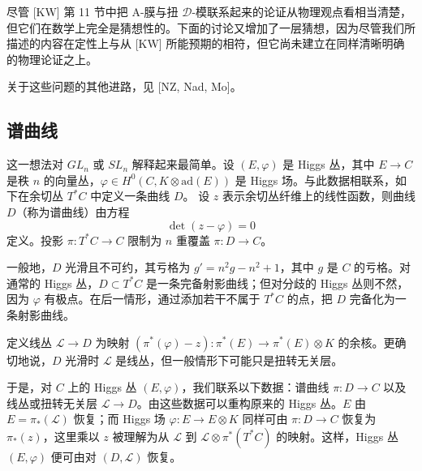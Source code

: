 尽管 [KW] 第 11 节中把 A-膜与扭 $\mathcal{D}$-模联系起来的论证从物理观点看相当清楚，但它们在数学上完全是猜想性的。下面的讨论又增加了一层猜想，因为尽管我们所描述的内容在定性上与从 [KW] 所能预期的相符，但它尚未建立在同样清晰明确的物理论证之上。

关于这些问题的其他进路，见 [NZ, Nad, Mo]。

\subsection{谱曲线}

这一想法对 $GL_n$ 或 $SL_n$ 解释起来最简单。设 $(E,\varphi)$ 是 Higgs 丛，其中 $E\to C$ 是秩 $n$ 的向量丛，$\varphi\in H^0(C,K\otimes\mathrm{ad}(E))$ 是 Higgs 场。与此数据相联系，如下在余切丛 $T^*C$ 中定义一条曲线 $D$。
设 $z$ 表示余切丛纤维上的线性函数，则曲线 $D$（称为谱曲线）由方程
\begin{equation}\tag{4.1}
\det(z-\varphi)=0
\end{equation}
定义。投影 $\pi:T^*C\to C$ 限制为 $n$ 重覆盖 $\pi:D\to C$。

一般地，$D$ 光滑且不可约，其亏格为 $g'=n^2g-n^2+1$，其中 $g$ 是 $C$ 的亏格。对通常的 Higgs 丛，$D\subset T^*C$ 是一条完备射影曲线；但对分歧的 Higgs 丛则不然，因为 $\varphi$ 有极点。在后一情形，通过添加若干不属于 $T^*C$ 的点，把 $D$ 完备化为一条射影曲线。


定义线丛 $\mathcal{L}\to D$ 为映射 $(\pi^*(\varphi)-z):\pi^*(E)\to\pi^*(E)\otimes K$ 的余核。更确切地说，$D$ 光滑时 $\mathcal{L}$ 是线丛，但一般情形下可能只是扭转无关层。

于是，对 $C$ 上的 Higgs 丛 $(E,\varphi)$，我们联系以下数据：谱曲线 $\pi:D\to C$ 以及线丛或扭转无关层 $\mathcal{L}\to D$。由这些数据可以重构原来的 Higgs 丛。$E$ 由 $E=\pi_*(\mathcal{L})$ 恢复；而 Higgs 场 $\varphi:E\to E\otimes K$ 同样可由 $\pi:D\to C$ 恢复为 $\pi_*(z)$，这里乘以 $z$ 被理解为从 $\mathcal{L}$ 到 $\mathcal{L}\otimes\pi^*(T^*C)$ 的映射。这样，Higgs 丛 $(E,\varphi)$ 便可由对 $(D,\mathcal{L})$ 恢复。

